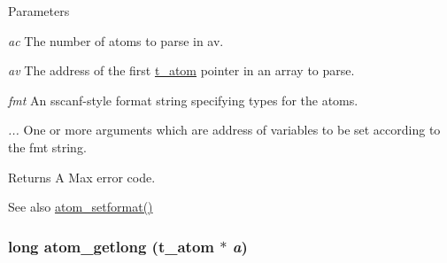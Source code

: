 \begin{DoxyParams}{Parameters}
\item[{\em ac}]The number of atoms to parse in av. \item[{\em av}]The address of the first \hyperlink{structt__atom}{t\_\-atom} pointer in an array to parse. \item[{\em fmt}]An sscanf-\/style format string specifying types for the atoms. \item[{\em ...}]One or more arguments which are address of variables to be set according to the fmt string.\end{DoxyParams}
\begin{DoxyReturn}{Returns}
A Max error code. 
\end{DoxyReturn}
\begin{DoxySeeAlso}{See also}
\hyperlink{group__atom_ga7a00fdf0699ae5176d39d7ddc3529bf0}{atom\_\-setformat()} 
\end{DoxySeeAlso}
\hypertarget{group__atom_ga62c0a631f50db54ec654a9e40b992fe2}{
\subsubsection[{atom\_\-getlong}]{\setlength{\rightskip}{0pt plus 5cm}long atom\_\-getlong ({\bf t\_\-atom} $\ast$ {\em a})}}
\label{group__atom_ga62c0a631f50db54ec654a9e40b992fe2}


